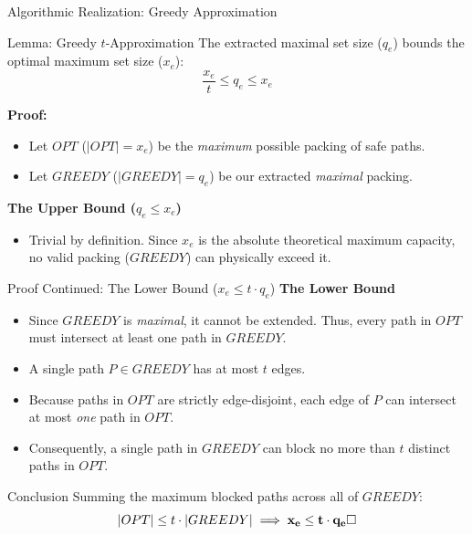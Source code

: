 \documentclass[10pt]{beamer}
\begin{document}
\begin{frame}{Algorithmic Realization: Greedy Approximation}
    \begin{block}{Lemma: Greedy $t$-Approximation}
        The extracted maximal set size ($q_e$) bounds the optimal maximum set size ($x_e$):
        \[ \frac{x_e}{t} \le q_e \le x_e \]
    \end{block}
    
    \vspace{0.4cm}
    \textbf{Proof:}
    \begin{itemize}
        \item Let $OPT$ ($|OPT| = x_e$) be the \textit{maximum} possible packing of safe paths.
        \item Let $GREEDY$ ($|GREEDY| = q_e$) be our extracted \textit{maximal} packing.
    \end{itemize}
    
    \vspace{0.4cm}
    \textbf{The Upper Bound ($q_e \le x_e$)}
    \begin{itemize}
        \item Trivial by definition. Since $x_e$ is the absolute theoretical maximum capacity, no valid packing ($GREEDY$) can physically exceed it.
    \end{itemize}
\end{frame}

\begin{frame}{Proof Continued: The Lower Bound ($x_e \le t \cdot q_e$)}
    \textbf{The Lower Bound}
    
    \vspace{0.3cm}
    \begin{itemize}
        \item Since $GREEDY$ is \textit{maximal}, it cannot be extended. Thus, every path in $OPT$ must intersect at least one path in $GREEDY$.
        
        \vspace{0.2cm}
        \item A single path $P \in GREEDY$ has at most $t$ edges.
        
        \vspace{0.2cm}
        \item Because paths in $OPT$ are strictly edge-disjoint, each edge of $P$ can intersect at most \textit{one} path in $OPT$.
        
        \vspace{0.2cm}
        \item Consequently, a single path in $GREEDY$ can block no more than $t$ distinct paths in $OPT$.
    \end{itemize}
    
    \vspace{0.4cm}
    \begin{block}{Conclusion}
        Summing the maximum blocked paths across all of $GREEDY$:
        \[ |OPT| \le t \cdot |GREEDY| \implies \mathbf{x_e \le t \cdot q_e} \hfill \square \]
    \end{block}
\end{frame}
\end{document}
